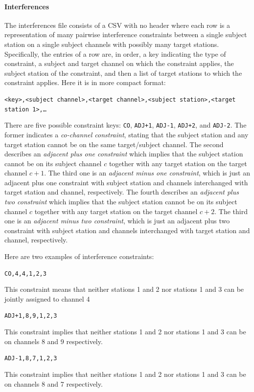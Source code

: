 \documentclass[
10pt, %
letterpaper, %
oneside, %
headinclude,footinclude, %
BCOR5mm, %
needspace, %
]{scrartcl}
\begin{document}
\paragraph{Interferences} The interferences file consists of a CSV with no header where each row is a representation of many pairwise interference constraints between a single subject station on a single subject channels with possibly many target stations. Specifically, the entries of a row are, in order, a key indicating the type of constraint, a subject and target channel on which the constraint applies, the subject station of the constraint, and then a list of target stations to which the constraint applies. Here it is in more compact format:
\begin{center}
	\texttt{<key>,<subject channel>,<target channel>,<subject station>,<target station 1>,\ldots}
\end{center}
There are five possible constraint keys: \texttt{CO}, \texttt{ADJ+1}, \texttt{ADJ-1}, \texttt{ADJ+2}, and \texttt{ADJ-2}. The former indicates a \emph{co-channel constraint}, stating that the subject station and any target station cannot be on the same target/subject channel. The second describes an \emph{adjacent plus one constraint} which implies that the subject station cannot be on its subject channel $c$ together with any target station on the target channel $c+1$. The third one is an \emph{adjacent minus one constraint}, which is just an adjacent plus one constraint with subject station and channels interchanged with target station and channel, respectively. The fourth describes an \emph{adjacent plus two constraint} which implies that the subject station cannot be on its subject channel $c$ together with any target station on the target channel $c+2$. The third one is an \emph{adjacent minus two constraint}, which is just an adjacent plus two constraint with subject station and channels interchanged with target station and channel, respectively.

Here are two examples of interference constraints:
\begin{center}
	\texttt{CO,4,4,1,2,3}
\end{center}
This constraint means that neither stations 1 and 2 nor stations 1 and 3 can be jointly assigned to channel 4
\begin{center}
	\texttt{ADJ+1,8,9,1,2,3}
\end{center}
This constraint implies that neither stations 1 and 2 nor stations 1 and 3 can be on channels 8 and 9 respectively.
\begin{center}
	\texttt{ADJ-1,8,7,1,2,3}
\end{center}
This constraint implies that neither stations 1 and 2 nor stations 1 and 3 can be on channels 8 and 7 respectively.
\end{document}
